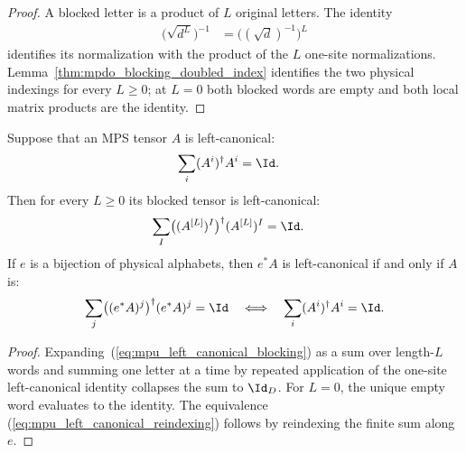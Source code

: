 \begin{proof}\leanok
    A blocked letter is a product of $L$ original letters. The identity
    \begin{align}
        \bigl(\sqrt{d^L}\bigr)^{-1}
         & =\bigl((\sqrt d)^{-1}\bigr)^L
    \end{align}
    identifies its normalization with the product of the $L$ one-site
    normalizations. Lemma~\ref{thm:mpdo_blocking_doubled_index}
    identifies the two physical indexings for every $L\geq0$; at $L=0$ both
    blocked words are empty and both local matrix products are the identity.
\end{proof}

\begin{lemma}
    \label{thm:mpu_left_canonical_blocking_reindexing}
    \leanok
    Suppose that an MPS tensor $A$ is left-canonical:
    \begin{align}
        \sum_i (A^i)^\dagger A^i & =\Id.
    \end{align}
    Then for every $L\geq0$ its blocked tensor is left-canonical:
    \begin{align}
        \sum_I \bigl((A^{[L]})^I\bigr)^\dagger(A^{[L]})^I & =\Id.
        \label{eq:mpu_left_canonical_blocking}
    \end{align}
    If $e$ is a bijection of physical alphabets, then $e^*A$ is
    left-canonical if and only if $A$ is:
    \begin{align}
        \sum_j \bigl((e^*A)^j\bigr)^\dagger(e^*A)^j=\Id
        \quad\Longleftrightarrow\quad
        \sum_i(A^i)^\dagger A^i=\Id.
        \label{eq:mpu_left_canonical_reindexing}
    \end{align}
\end{lemma}

\begin{proof}\leanok
    Expanding~(\ref{eq:mpu_left_canonical_blocking}) as a sum over
    length-$L$ words and summing one letter at a time by repeated application of the
    one-site left-canonical identity collapses the sum to $\Id_D$. For $L=0$, the unique empty word
    evaluates to the identity. The equivalence
    (\ref{eq:mpu_left_canonical_reindexing}) follows by reindexing the finite
    sum along $e$.
\end{proof}

